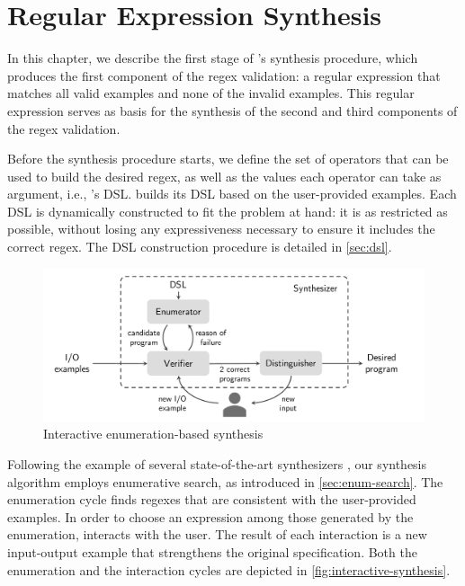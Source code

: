 \chapter{Regular Expression Synthesis}\label{chap:regex-synthesis}

In this chapter, we describe the first stage of \Forest{}'s synthesis procedure, which produces the first component of the regex validation: a regular expression that matches all valid examples and none of the invalid examples. This regular expression serves as basis for the synthesis of the second and third components of the regex validation.


Before the synthesis procedure starts, we define the set of operators that can be used to build the desired regex, as well as the values each operator can take as argument, i.e., \Forest{}'s \ac{DSL}. \Forest{} builds its \ac{DSL} based on the user-provided examples. Each \ac{DSL} is dynamically constructed to fit the problem at hand: it is as restricted as possible, without losing any expressiveness necessary to ensure it includes the correct regex. The \ac{DSL} construction procedure is detailed in \autoref{sec:dsl}.

\begin{figure}[t]
    \centering
    \includegraphics[scale=.35]{pictures/interactive_synthesis.pdf}
    \caption{Interactive enumeration-based synthesis}
    \label{fig:interactive-synthesis}
\end{figure}

Following the example of several state-of-the-art synthesizers \cite{DBLP:conf/pldi/FengMGDC17,DBLP:conf/pldi/FengMBD18,AlphaRegex16,Orvalho19,DBLP:conf/cav/ReynoldsBNBT19,DBLP:journals/pvldb/OrvalhoTVMM20}, our synthesis algorithm employs enumerative search, as introduced in \autoref{sec:enum-search}. The enumeration cycle finds regexes that are consistent with the user-provided examples. In order to choose an expression among those generated by the enumeration,  \Forest{} interacts with the user. The result of each interaction is a new input-output example that strengthens the original specification. Both the enumeration and the interaction cycles are depicted in \autoref{fig:interactive-synthesis}.

